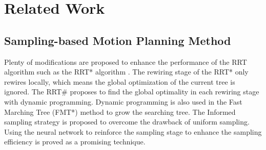 \section{Related Work}


\subsection{Sampling-based Motion Planning Method}

Plenty of modifications are proposed to enhance the performance of the RRT algorithm \cite{lavalle1998rapidly} such as the RRT* algorithm \cite{karaman2011sampling}.
The rewiring stage of the RRT* only rewires locally, which means the global optimization of the current tree is ignored. 
The RRT\# \cite{arslan2013use} proposes to find the global optimality in each rewiring stage with dynamic programming.
Dynamic programming is also used in the Fast Marching Tree (FMT*) method \cite{janson2015fast} to grow the searching tree.
The Informed sampling strategy \cite{gammell2014informed, gammell2018informed} is proposed to overcome the drawback of uniform sampling.
Using the neural network to reinforce the sampling stage to enhance the sampling efficiency \cite{wang2020neural, li2021efficient, qureshi2019motion} is proved as a promising technique.







